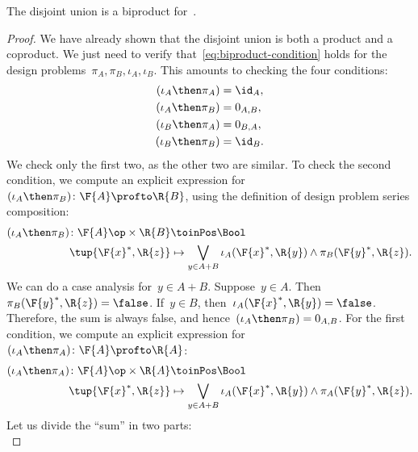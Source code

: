 \begin{lemma}
  The disjoint union is a biproduct for~\DP.
\end{lemma}
\begin{proof}
  We have already shown that the disjoint union is both
  a product and a coproduct. We just need to verify that~\cref{eq:biproduct-condition} holds
  for the design problems~$\pi_A, \pi_B, \iota_A, \iota_B$.
  This amounts to checking the four conditions:
  \begin{equation}
    \begin{aligned}
      (\iota_A\then \pi_A) &= \id_{A}, \\
      (\iota_A\then \pi_B) &= 0_{A,B}, \\
      (\iota_B\then \pi_A) &= 0_{B,A},\\
      (\iota_B\then \pi_B) &= \id_{B}.
    \end{aligned}
  \end{equation}
  We check only the first two, as the other two are similar.
  To check the second condition, we compute an explicit expression for~$(\iota_A\then \pi_B)\colon \F{A} \profto \R{B}$, using the definition
  of design problem series composition:
  \begin{equation}
    \begin{aligned}
      (\iota_A\then \pi_B) \colon  \F{A}\op\times \R{B} & \toinPos \Bool \\
      \tup{\F{x}^*, \R{z}} &\mapsto
      \bigvee_{y \in A + B} \iota_A(\F{x}^*,\R{y}) \wedge \pi_B(\F{y}^*,\R{z}).
    \end{aligned}
  \end{equation}
  We can do a case analysis for~$y\in A+B$. Suppose~$y\in A$.
  Then~$\pi_B(\F{y}^*,\R{z}) = \false$. If~$y \in B$, then~$\iota_A(\F{x}^*,\R{y}) = \false$.
  Therefore, the sum is always false, and hence~$(\iota_A\then \pi_B) = 0_{A,B}$.
  For the first condition, we compute an explicit expression for~$(\iota_A\then \pi_A) \colon \F{A} \profto \R{A}$:
  \begin{equation}
    \begin{aligned}
      (\iota_A\then \pi_A) \colon  \F{A}\op\times \R{A} & \toinPos \Bool \\
      \tup{\F{x}^*, \R{z}} &\mapsto
      \bigvee_{y \in A + B} \iota_A(\F{x}^*,\R{y}) \wedge \pi_A(\F{y}^*,\R{z}).
    \end{aligned}
  \end{equation}
  Let us divide the ``sum'' in two parts:
  \begin{equation}

\end{equation}
\end{proof}
